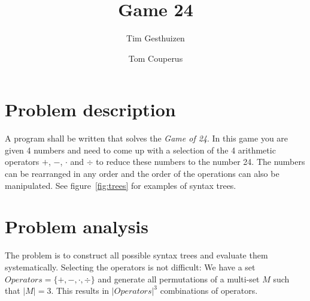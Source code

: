 \documentclass[11pt,a4paper]{article}
\author{Tim Gesthuizen \and Tom Couperus}
\title{Game 24}
\begin{document}
\maketitle

\tableofcontents

\section{Problem description}

A program shall be written that solves the \textit{Game of 24}.
In this game you are given 4 numbers and need to come up with a
selection of the 4 arithmetic operators $+$, $-$, $\cdot$ and $\div$ to
reduce these numbers to the number 24.
The numbers can be rearranged in any order and the order of the
operations can also be manipulated.
See figure~\ref{fig:trees} for examples of syntax trees.




\section{Problem analysis}
\label{sec:analysis}

The problem is to construct all possible syntax trees and evaluate
them systematically.
Selecting the operators is not difficult:
We have a set $Operators = \{+, -, \cdot, \div\}$ and generate all
permutations of a multi-set $M$ such that $\vert M \vert = 3$.
\newcommand{\complexop}{{\vert Operators \vert}^3}
\newcommand{\opconnect}{4 \cdot 3 \cdot 3 \cdot 2 \cdot 2 \cdot 1}
This results in $\complexop$ combinations of
operators.
\end{document}
